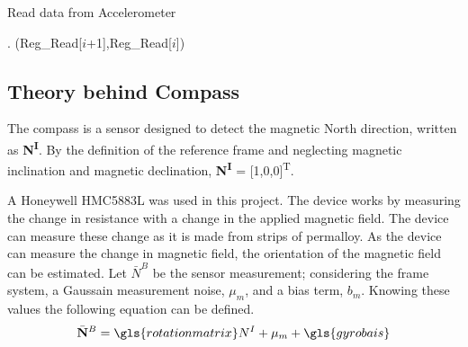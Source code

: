 	\begin{algorithm}
		\caption{Read data from Accelerometer}\label{Alg: read from accel}
		\begin{algorithmic}[1]
		 . 		
		 (Reg\_Read[$i$+1],Reg\_Read[$i$])
		\EndFor	
		\State {}
		\EndWhile
		\EndProcedure
	\end{algorithmic}
\end{algorithm}


 \tocless\subsection{Theory behind Compass}
The compass is a sensor designed to detect the magnetic North direction, written as {\bf  N\textsuperscript I}. By the definition of the reference frame and neglecting  magnetic inclination and magnetic declination, {\bf  N\textsuperscript I} = [1,0,0]\textsuperscript T.

A Honeywell HMC5883L was used in this project. The device works by measuring the change in resistance with a change in the applied magnetic field. The device can measure these change as it is made from strips of permalloy. As the device can measure the change in magnetic field, the orientation of the magnetic field can be estimated. Let $\bar{N}^B$ be the sensor measurement; considering the frame system, a Gaussain measurement noise, $\mu_m$, and a bias term, $b_m$. Knowing these values the following equation can be defined.
\begin{equation}
	\bar{\bf N}^B = \gls{rotationmatrix}N^I + \mu_m + \gls{gyrobais} \nonumber
\end{equation}

